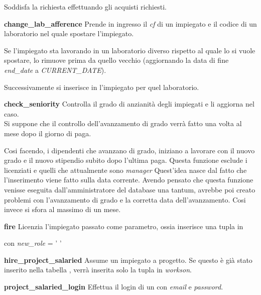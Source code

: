 Soddisfa la richiesta effettuando gli acquisti richiesti.
\bigskip

\noindent \textbf{change\_lab\_afference}\sskip
Prende in ingresso il \textit{cf} di un impiegato e il codice di un laboratorio nel quale spostare l'impiegato.

Se l'impiegato sta lavorando in un laboratorio diverso rispetto al quale lo si vuole spostare, lo rimuove prima da quello vecchio (aggiornando la data di fine \textit{end\_date} a \textit{CURRENT\_DATE}).

Successivamente si inserisce in \textit{\worksat} l'impiegato per quel laboratorio.
\bigskip

\noindent \textbf{check\_seniority}\sskip
Controlla il grado di anzianità degli impiegati e li aggiorna nel caso.\\
Si suppone che il controllo dell'avanzamento di grado verrà fatto una volta al mese dopo il giorno di paga.

Cosi facendo, i dipendenti che avanzano di grado, iniziano a lavorare con il nuovo grado e il nuovo stipendio subito dopo l'ultima paga.\sskip
Questa funzione esclude i licenziati e quelli che attualmente sono \textit{manager}\meskip
Quest'idea nasce dal fatto che l'inserimento viene fatto sulla data corrente.
Avendo pensato che questa funzione venisse eseguita dall'amministratore del database una tantum, avrebbe poi creato problemi con l'avanzamento di grado e la corretta data dell'avanzamento.
Cosi invece si sfora al massimo di un mese.
\bigskip

\noindent \textbf{fire}\sskip
Licenzia l'impiegato passato come parametro, ossia inserisce una tupla in

\textit{\careerlog} con \textit{new\_role} = ' '
\bigskip

\noindent \textbf{hire\_project\_salaried}\sskip
Assume un impiegato a progetto. Se questo è già stato inserito nella tabella \textit{\projectsalaried}, verrà inserita solo la tupla in \textit{workson}.
\bigskip

\noindent \textbf{project\_salaried\_login}\sskip
Effettua il login di un \textit{\projectsalaried} con \textit{email} e \textit{password}.

